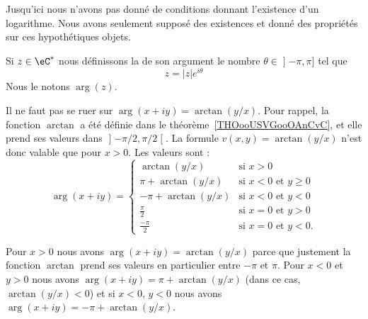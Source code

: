 \begin{remark}
    Jusqu'ici nous n'avons pas donné de conditions donnant l'existence d'un logarithme. Nous avons seulement supposé des existences et donné des propriétés sur ces hypothétiques objets.
\end{remark}

\begin{definition}
Si \( z\in \eC^*\) nous définissons la  de son argument le nombre \( \theta\in \mathopen] -\pi , \pi \mathclose]\) tel que
\begin{equation}
    z=| z | e^{i\theta}
\end{equation}
Nous le notons \( \arg(z)\).
\end{definition}

\begin{normaltext}      \label{NORMooOGHNooYriCBH}
    Il ne faut pas se ruer sur \( \arg(x+iy)=\arctan(y/x)\). Pour rappel, la fonction \( \arctan\) a été définie dans le théorème~\ref{THOooUSVGooOAnCvC}, et elle prend ses valeurs dans \( \mathopen] -\pi/2 , \pi/2 \mathclose[\). La formule \( v(x,y)=\arctan(y/x)\) n'est donc valable que pour \( x>0\). Les valeurs sont :
        \begin{equation}        \label{EQooPJVFooSEKTny}
            \arg(x+iy)=\begin{cases}
                 \arctan(y/x)   &   \text{si } x>0\\
                 \pi+\arctan(y/x)    &    \text{si } x<0\text{ et }y\geq 0 \\
                 -\pi+\arctan(y/x)    &    \text{si } x<0 \text{ et }y<0\\
                 \frac{ \pi }{ 2 }    &    \text{si } x=0 \text{ et }y>0\\
                 \frac{- \pi }{ 2 }    &    \text{si } x=0 \text{ et }y<0.
            \end{cases}
        \end{equation}

    Pour \( x>0\) nous avons \( \arg(x+iy)=\arctan(y/x)  \) parce que justement la fonction \( \arctan\) prend ses valeurs en particulier entre \( -\pi\) et \( \pi\). Pour \( x<0\) et \( y>0 \) nous avons \( \arg(x+iy)=\pi+\arctan(y/x)\) (dans ce cas, \( \arctan(y/x)<0\)) et si \( x<0\), \( y<0\) nous avons \( \arg(x+iy)=-\pi+\arctan(y/x)\).
\end{normaltext}


